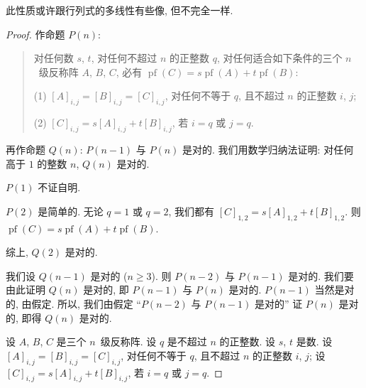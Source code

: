 此性质或许跟行列式的多线性有些像, 但不完全一样.

\begin{proof}
    作命题 \(P(n)\):
    \begin{quotation}
        对任何数 \(s\), \(t\),
        对任何不超过 \(n\) 的正整数 \(q\),
        对任何适合如下条件的三个 \(n\)~级反称阵 \(A\), \(B\), \(C\),
        必有
        \(
        \operatorname{pf} {(C)}
        = s \operatorname{pf} {(A)}
        + t \operatorname{pf} {(B)}
        \):

        (1)
        \([A]_{i,j} = [B]_{i,j} = [C]_{i,j}\),
        对任何不等于 \(q\), 且不超过 \(n\) 的正整数 \(i\), \(j\);

        (2)
        \([C]_{i,j} = s[A]_{i,j} + t[B]_{i,j}\),
        若 \(i = q\) 或 \(j = q\).
    \end{quotation}
    再作命题 \(Q(n)\):
    \(P(n-1)\) 与 \(P(n)\) 是对的.
    我们用数学归纳法证明:
    对任何高于 \(1\) 的整数 \(n\), \(Q(n)\) 是对的.

    \(P(1)\) 不证自明.

    \(P(2)\) 是简单的.
    无论 \(q = 1\) 或 \(q = 2\),
    我们都有 \([C]_{1,2} = s[A]_{1,2} + t[B]_{1,2}\).
    则 \(\operatorname{pf} {(C)}
    = s \operatorname{pf} {(A)}
    + t \operatorname{pf} {(B)}\).

    综上, \(Q(2)\) 是对的.

    我们设 \(Q(n-1)\) 是对的 (\(n \geq 3\)).
    则 \(P(n-2)\) 与 \(P(n-1)\) 是对的.
    我们要由此证明 \(Q(n)\) 是对的,
    即 \(P(n-1)\) 与 \(P(n)\) 是对的.
    \(P(n-1)\) 当然是对的, 由假定.
    所以, 我们由假定
    ``\(P(n-2)\) 与 \(P(n-1)\) 是对的''
    证 \(P(n)\) 是对的,
    即得 \(Q(n)\) 是对的.

    设 \(A\), \(B\), \(C\) 是三个 \(n\)~级反称阵.
    设 \(q\) 是不超过 \(n\) 的正整数.
    设 \(s\), \(t\) 是数.
    设 \([A]_{i,j} = [B]_{i,j} = [C]_{i,j}\),
    对任何不等于 \(q\), 且不超过 \(n\) 的正整数 \(i\), \(j\);
    设 \([C]_{i,j} = s[A]_{i,j} + t[B]_{i,j}\),
    若 \(i = q\) 或 \(j = q\).


\end{proof}
